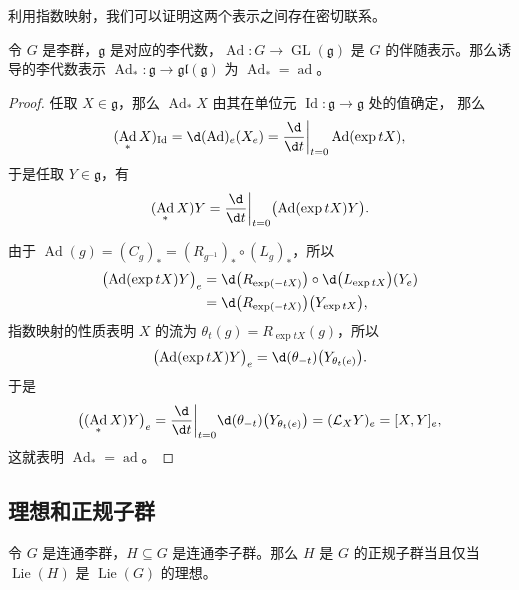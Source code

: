 \documentclass[fontset=none]{Notes}
\DeclareMathOperator\Ad{Ad}
\DeclareMathOperator\ad{ad}
\DeclareMathOperator\GL{GL}
\DeclareMathOperator\Lie{Lie}
\DeclareMathOperator\Id{Id}
\newcommand{\lie}[1]{\mathfrak{#1}}
\begin{document}
利用指数映射，我们可以证明这两个表示之间存在密切联系。

\begin{theorem}
  令 $G$ 是李群，$\lie g$ 是对应的李代数，$\Ad:G\to\GL(\lie g)$ 是
  $G$ 的伴随表示。那么诱导的李代数表示 $\Ad_*:\lie g\to \lie{gl}(\lie g)$
  为 $\Ad_*=\ad$。
\end{theorem}
\begin{proof}
  任取 $X\in\lie g$，那么 $\Ad_*X$ 由其在单位元 $\Id:\lie g\to\lie g$ 处的值确定，
  那么
  \[
    (\Ad_*X)_{\Id}=\d(\Ad)_e(X_e)=\frac{\d}{\d t}\bigg|_{t=0}\Ad(\exp tX),  
  \]
  于是任取 $Y\in\lie g$，有
  \[
    (\Ad_*X)Y
    =\frac{\d}{\d t}\bigg|_{t=0}\bigl(\Ad(\exp tX)Y\bigr).
  \]

  由于 $\Ad(g)=(C_g)_*=(R_{g^{-1}})_*\circ (L_g)_*$，所以
  \begin{align*}
    \bigl(\Ad(\exp tX)Y\bigr)_{e}&=\d\bigl(R_{\exp(-t X)}\bigr)
    \circ\d\bigl(L_{\exp tX}\bigr)(Y_e)\\
    &=\d\bigl(R_{\exp(-t X)}\bigr)\bigl(Y_{\exp tX}\bigr),
  \end{align*}
  指数映射的性质表明 $X$ 的流为 $\theta_t(g)=R_{\exp tX}(g)$，所以
  \[
    \bigl(\Ad(\exp tX)Y\bigr)_{e}=\d(\theta_{-t})\bigl(Y_{\theta_t(e)}\bigr).
  \]
  于是
  \[
    \bigl((\Ad_*X)Y\bigr)_e=\frac{\d}{\d t}\bigg|_{t=0}\d(\theta_{-t})\bigl(Y_{\theta_t(e)}\bigr)
    =(\mathcal{L}_XY)_e=[X,Y]_e,
  \]
  这就表明 $\Ad_*=\ad$。
\end{proof}

\subsection{理想和正规子群}

\begin{theorem}[理想和正规子群]
  令 $G$ 是连通李群，$H\subseteq G$ 是连通李子群。那么 $H$
  是 $G$ 的正规子群当且仅当 $\Lie(H)$ 是 $\Lie(G)$ 的理想。
\end{theorem}
\end{document}
